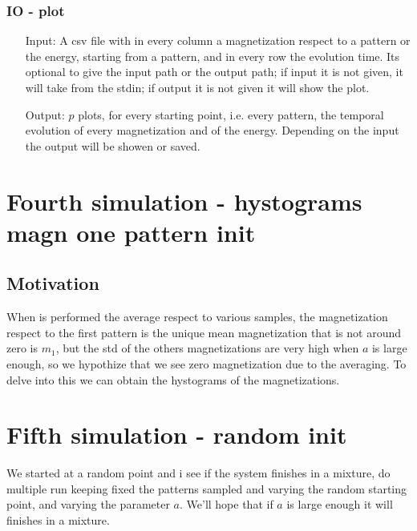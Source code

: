 \documentclass[a4paper,10pt]{article}
\begin{document}
\subsubsection{IO - plot}
\begin{itemize}
 \item[Input:] A csv file with in every column a magnetization respect to a pattern or the energy, starting from a pattern, and in every row the evolution time. Its optional to give the input path or the output path; if input it is not given, it will take from the stdin; if output it is not given it will show the plot.
 \item[Output:] $p$ plots, for every starting point, i.e. every pattern, the temporal evolution of every magnetization and of the energy. Depending on the input the output will be showen or saved.
\end{itemize}

\section{Fourth simulation - hystograms magn one pattern init}

\subsection{Motivation}
When is performed the average respect to various samples, the magnetization respect to the first pattern is the unique mean magnetization that is not around zero is $m_1$, but the std of the others magnetizations are very high when $a$ is large enough, so we hypothize that we see zero magnetization due to the averaging. To delve into this we can obtain the hystograms of the magnetizations.

\section{Fifth simulation - random init}

We started at a random point and i see if the system finishes in a mixture, do multiple run keeping fixed the patterns sampled and varying the random starting point, and varying the parameter $a$. We'll hope that if $a$ is large enough it will finishes in a mixture.


\printbibliography
\end{document}
